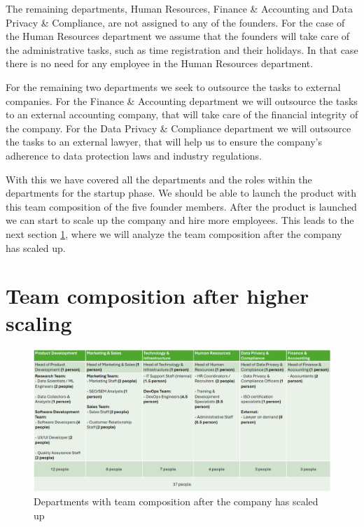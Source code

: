 \p
The remaining departments, Human Resources, Finance \& Accounting and Data Privacy \& Compliance, are not assigned to any of the founders.
For the case of the Human Resources department we assume that the founders will take care of the administrative tasks, such as time registration and their holidays.
In that case there is no need for any employee in the Human Resources department.

\p
For the remaining two departments we seek to outsource the tasks to external companies.
For the Finance \& Accounting department we will outsource the tasks to an external accounting company, that will take care of the financial integrity of the company.
For the Data Privacy \& Compliance department we will outsource the tasks to an external lawyer, that will help us to ensure the company's adherence to data protection laws and industry regulations.

\p
With this we have covered all the departments and the roles within the departments for the startup phase.
We should be able to launch the product with this team composition of the five founder members.
After the product is launched we can start to scale up the company and hire more employees.
This leads to the next section \ref{sec:team_comp_highscaled}, where we will analyze the team composition after the company has scaled up.

\section{Team composition after higher scaling}
\label{sec:team_comp_highscaled}

\begin{figure}[H]
    \centering
    \includegraphics[width=\textwidth]{figures/team_comp_highscaled.png}
    \caption{Departments with team composition after the company has scaled up}
    \label{fig:team_comp_highscaled}
\end{figure}